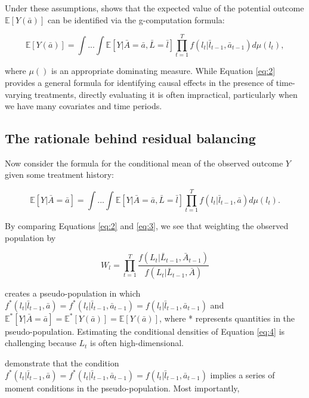Under these assumptions, \citet{robinsNewApproachCausal1986} shows that
the expected value of the potential outcome \(\mathbb{E}[Y(\bar{a})]\)
can be identified via the g-computation formula:

\begin{equation}
\label{eq:2}
\mathbb{E}[Y(\bar{a})]=\int...\int\mathbb{E}[Y|\bar{A}=\bar{a}, \bar{L}=\bar{l}]\prod^{T}_{t=1}f(l_{t}|\bar{l}_{t-1},\bar{a}_{t-1})d\mu(l_{t}),
\end{equation}

where \(\mu()\) is an appropriate dominating measure. While Equation
\ref{eq:2} provides a general formula for identifying causal effects in
the presence of time-varying treatments, directly evaluating it is often
impractical, particularly when we have many covariates and time periods.

\hypertarget{rbw-panel}{%
\subsection{The rationale behind residual balancing}\label{rbw-panel}}

Now consider the formula for the conditional mean of the observed
outcome \(Y\) given some treatment history:

\begin{equation}
\label{eq:3}
\mathbb{E}[Y|\bar{A}=\bar{a}]=\int...\int\mathbb{E}[Y|\bar{A}=\bar{a}, \bar{L}=\bar{l}]\prod^{T}_{t=1}f(l_{t}|\bar{l}_{t-1},\bar{a})d\mu(l_{t}).
\end{equation}

By comparing Equations \ref{eq:2} and \ref{eq:3}, we see that weighting
the observed population by

\begin{equation}
\label{eq:4}
W_{l}=\prod^{T}_{t=1}\frac{f(L_{t}|\bar{L}_{t-1},\bar{A}_{t-1})}{f(L_{t}|\bar{L}_{t-1},\bar{A})}
\end{equation}

creates a pseudo-population in which
\(f^{*}(l_{t}|\bar{l}_{t-1},\bar{a})=f^{*}(l_{t}|\bar{l}_{t-1},\bar{a}_{t-1})=f(l_{t}|\bar{l}_{t-1},\bar{a}_{t-1})\)
and
\(\mathbb{E}^{*}[Y|\bar{A}=\bar{a}]=\mathbb{E}^{*}[Y(\bar{a})]=\mathbb{E}[Y(\bar{a})]\),
where * represents quantities in the pseudo-population. Estimating the
conditional densities of Equation \ref{eq:4} is challenging because
\(L_{t}\) is often high-dimensional.

\sloppy \citet{zhouResidualBalancingMethod2020a} demonstrate that the
condition
\(f^{*}(l_{t}|\bar{l}_{t-1},\bar{a})=f^{*}(l_{t}|\bar{l}_{t-1},\bar{a}_{t-1})=f(l_{t}|\bar{l}_{t-1},\bar{a}_{t-1})\)
implies a series of moment conditions in the pseudo-population. Most
importantly,

